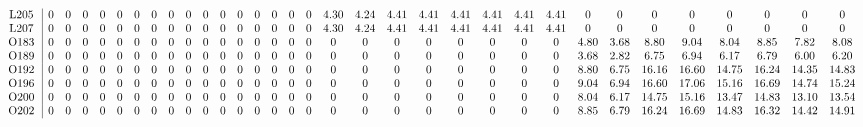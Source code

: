 \begin{table}[H]
\begin{center}
\begin{math}
\begin{array}{c|cccccccccccccccccccccccccccccccc}
\mathrm{L205} \hspace*{2pt} &  0 &  0 &  0 &  0 &  0 &  0 &  0 &  0 &  0 &  0 &  0 &  0 &  0 &  0 &  0 &  0 &       4.30 &       4.24 &       4.41 &       4.41 &       4.41 &       4.41 &       4.41 &       4.41 &  0 &  0 &  0 &  0 &  0 &  0 &  0 &  0 \\
\mathrm{L207} \hspace*{2pt} &  0 &  0 &  0 &  0 &  0 &  0 &  0 &  0 &  0 &  0 &  0 &  0 &  0 &  0 &  0 &  0 &       4.30 &       4.24 &       4.41 &       4.41 &       4.41 &       4.41 &       4.41 &       4.41 &  0 &  0 &  0 &  0 &  0 &  0 &  0 &  0 \\
\mathrm{O183} \hspace*{2pt} &  0 &  0 &  0 &  0 &  0 &  0 &  0 &  0 &  0 &  0 &  0 &  0 &  0 &  0 &  0 &  0 &  0 &  0 &  0 &  0 &  0 &  0 &  0 &  0 &       4.80 &       3.68 &       8.80 &       9.04 &       8.04 &       8.85 &       7.82 &       8.08 \\
\mathrm{O189} \hspace*{2pt} &  0 &  0 &  0 &  0 &  0 &  0 &  0 &  0 &  0 &  0 &  0 &  0 &  0 &  0 &  0 &  0 &  0 &  0 &  0 &  0 &  0 &  0 &  0 &  0 &       3.68 &       2.82 &       6.75 &       6.94 &       6.17 &       6.79 &       6.00 &       6.20 \\
\mathrm{O192} \hspace*{2pt} &  0 &  0 &  0 &  0 &  0 &  0 &  0 &  0 &  0 &  0 &  0 &  0 &  0 &  0 &  0 &  0 &  0 &  0 &  0 &  0 &  0 &  0 &  0 &  0 &       8.80 &       6.75 &      16.16 &      16.60 &      14.75 &      16.24 &      14.35 &      14.83 \\
\mathrm{O196} \hspace*{2pt} &  0 &  0 &  0 &  0 &  0 &  0 &  0 &  0 &  0 &  0 &  0 &  0 &  0 &  0 &  0 &  0 &  0 &  0 &  0 &  0 &  0 &  0 &  0 &  0 &       9.04 &       6.94 &      16.60 &      17.06 &      15.16 &      16.69 &      14.74 &      15.24 \\
\mathrm{O200} \hspace*{2pt} &  0 &  0 &  0 &  0 &  0 &  0 &  0 &  0 &  0 &  0 &  0 &  0 &  0 &  0 &  0 &  0 &  0 &  0 &  0 &  0 &  0 &  0 &  0 &  0 &       8.04 &       6.17 &      14.75 &      15.16 &      13.47 &      14.83 &      13.10 &      13.54 \\
\mathrm{O202} \hspace*{2pt} &  0 &  0 &  0 &  0 &  0 &  0 &  0 &  0 &  0 &  0 &  0 &  0 &  0 &  0 &  0 &  0 &  0 &  0 &  0 &  0 &  0 &  0 &  0 &  0 &       8.85 &       6.79 &      16.24 &      16.69 &      14.83 &      16.32 &      14.42 &      14.91 \\

\end{array}
\end{math}
\end{center}
\end{table}
